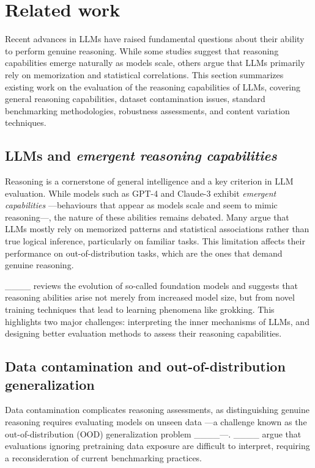 \section{Related work}
Recent advances in LLMs have raised fundamental questions about their ability to perform genuine reasoning. While some studies suggest that reasoning capabilities emerge naturally as models scale, others argue that LLMs primarily rely on memorization and statistical correlations. This section summarizes existing work on the evaluation of the reasoning capabilities of LLMs, covering general reasoning capabilities, dataset contamination issues, standard benchmarking methodologies, robustness assessments, and content variation techniques.

\subsection{LLMs and \textit{emergent reasoning capabilities}}

Reasoning is a cornerstone of general intelligence and a key criterion in LLM evaluation. While models such as GPT-4 and Claude-3 exhibit \textit{emergent capabilities} —behaviours that appear as models scale and seem to mimic reasoning—, the nature of these abilities remains debated. Many argue that LLMs mostly rely on memorized patterns and statistical associations rather than true logical inference, particularly on familiar tasks. This limitation affects their performance on out-of-distribution tasks, which are the ones that demand genuine reasoning.

____ reviews the evolution of so-called foundation models and suggests that reasoning abilities arise not merely from increased model size, but from novel training techniques that lead to learning phenomena like grokking. This highlights two major challenges: interpreting the inner mechanisms of LLMs, and designing better evaluation methods to assess their reasoning capabilities.

\subsection{Data contamination and out-of-distribution generalization}

Data contamination complicates reasoning assessments, as distinguishing genuine reasoning requires evaluating models on unseen data —a challenge known as the out-of-distribution (OOD) generalization problem ____—. ____ argue that evaluations ignoring pretraining data exposure are difficult to interpret, requiring a reconsideration of current benchmarking practices.


